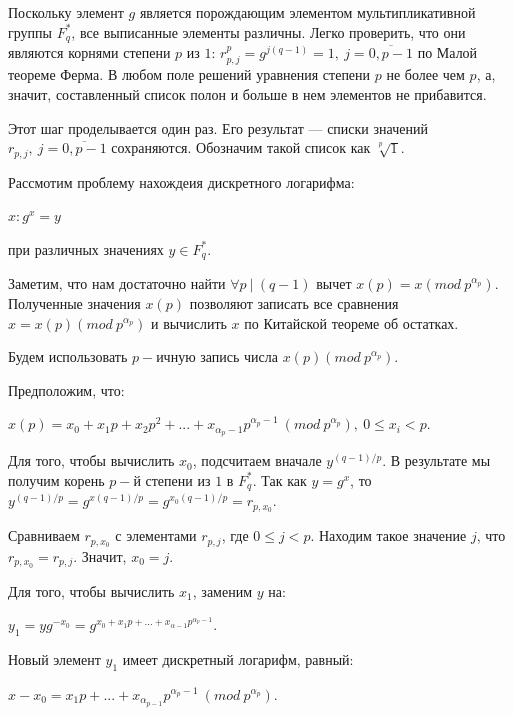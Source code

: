 \documentclass[bachelor, och, labwork]{shiza}
\begin{document}
Поскольку элемент $g$ является порождающим элементом мультипликативной группы $F_q^*$,
все выписанные элементы различны. Легко проверить, что они являются корнями 
степени $p$ из $1$: $r^p_{p,j} = g^{j(q-1)} = 1, ~j=\overline{0,p-1}$ по Малой
теореме Ферма. В любом поле решений уравнения степени $p$ не более чем $p$, а, 
значит, составленный список полон и больше в нем элементов не прибавится.

Этот шаг проделывается один раз. Его результат --- списки значений $r_{p,j}, ~ j=\overline{0,p-1}$
сохраняются. Обозначим такой список как $\sqrt[p]{1}$.

Рассмотим проблему нахождеия дискретного логарифма:

\begin{center}
    $x:g^x=y$
\end{center}

при различных значениях $y \in F^*_q$.

Заметим, что нам достаточно найти $\forall p ~|~(q-1)$ вычет $x(p)=x(\mathit{mod} ~p^{\alpha_p})$.
Полученные значения $x(p)$ позволяют записать все сравнения $x=x(p)(\mathit{mod}~p^{\alpha_p})$
и вычислить $x$ по Китайской теореме об остатках.

Будем использовать $p-$ичную запись числа $x(p)(\mathit{mod}~p^{\alpha_p})$.

Предположим, что:

\begin{center}
    $x(p) = x_0 + x_1p + x_2p^2 + ... + x_{\alpha_{p}-1}p^{\alpha_p-1} ~(\mathit{mod}~p^{\alpha_p}), ~0 \leqslant x_i < p$.
\end{center}

Для того, чтобы вычислить $x_0$, подсчитаем вначале $y^{(q-1)/p}$. В результате
мы получим корень $p-$й степени из $1$ в $F_q^*$. Так как $y=g^x$, то
$y^{(q-1)/p}=g^{x(q-1)/p}=g^{x_0(q-1)/p}=r_{p,x_0}$.

Сравниваем $r_{p,x_0}$ с элементами $r_{p,j}$, где $0\leqslant j < p$. Находим
такое значение $j$, что $r_{p, x_0}=r_{p,j}$. Значит, $x_0=j$.

Для того, чтобы вычислить $x_1$, заменим $y$ на:

\begin{center}
    $y_1=yg^{-x_0}=g^{x_0+x_1p+...+x_{\alpha - 1}p^{\alpha_p-1 }}$.
\end{center}

Новый элемент $y_1$ имеет дискретный логарифм, равный:

\begin{center}
    $x-x_0=x_1p + ... + x_{\alpha_{p-1}}p^{\alpha_p-1}~(\mathit{mod}~ p^{\alpha_p})$.
\end{center}
\end{document}
